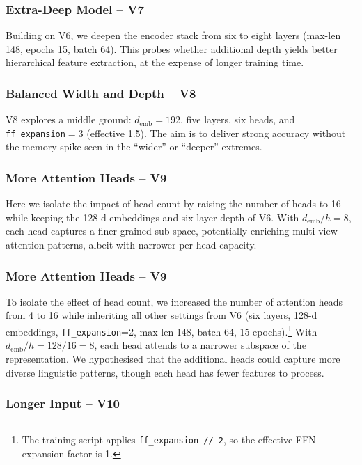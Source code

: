 \documentclass[twocolumn,superscriptaddress,aps]{revtex4-1}
\begin{document}
\subsubsection{Extra-Deep Model -- V7}

Building on V6, we deepen the encoder stack from six to eight layers (max-len 148, epochs 15, batch 64).
This probes whether additional depth yields better hierarchical feature extraction, at the expense of
longer training time.

\subsubsection{Balanced Width and Depth -- V8}

V8 explores a middle ground: $d_{\mathrm{emb}}=192$, five layers, six heads, and \texttt{ff\_expansion}$=3$ (effective
1.5). The aim is to deliver strong accuracy without the memory spike seen in the “wider” or “deeper”
extremes.

\subsubsection{More Attention Heads -- V9}

Here we isolate the impact of head count by raising the number of heads to 16 while keeping the
128-d embeddings and six-layer depth of V6. With $d_{\mathrm{emb}}/h = 8$, each head captures a finer‐grained
sub-space, potentially enriching multi-view attention patterns, albeit with narrower per-head capacity.
\subsubsection{More Attention Heads -- V9}

To isolate the effect of head count, we increased the number of attention heads from 4 to 16 while inheriting all other settings from V6 (six layers, 128-d embeddings, \texttt{ff\_expansion}=2, max-len 148, batch 64, 15 epochs).\footnote{The training script applies \texttt{ff\_expansion // 2}, so the effective FFN expansion factor is 1.}  
With $d_{\mathrm{emb}}/h = 128/16 = 8$, each head attends to a narrower subspace of the representation. We hypothesised that the additional heads could capture more diverse linguistic patterns, though each head has fewer features to process.

\subsubsection{Longer Input -- V10}
\end{document}
